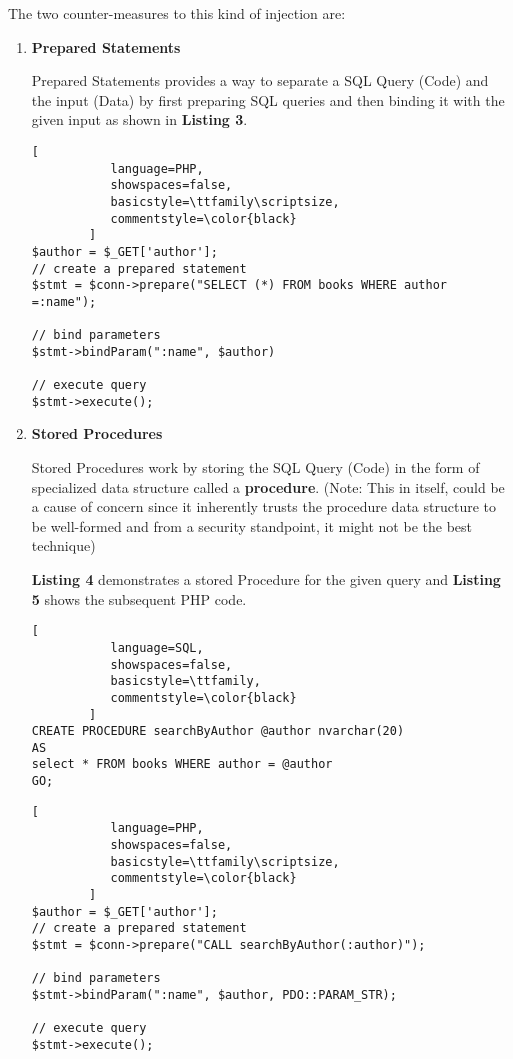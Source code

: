 \documentclass[10pt,a4paper,oneside]{article}
\begin{document}
The two counter-measures to this kind of injection are:
\begin{enumerate}
\item \textbf{Prepared Statements}


Prepared Statements provides a way to separate a SQL Query (Code) and the input (Data) by first preparing SQL queries and then binding it with the given input as shown in \textbf{Listing 3}.
\lstset{keywordstyle=\bfseries}
\begin{lstlisting}[
           language=PHP,
           showspaces=false,
           basicstyle=\ttfamily\scriptsize,
           commentstyle=\color{black}
        ]
$author = $_GET['author'];
// create a prepared statement
$stmt = $conn->prepare("SELECT (*) FROM books WHERE author =:name");

// bind parameters
$stmt->bindParam(":name", $author)

// execute query
$stmt->execute();
\end{lstlisting}

\item \textbf{Stored Procedures}

Stored Procedures work by storing the SQL Query (Code) in the form of specialized data structure called a \textbf{procedure}. (Note: This in itself, could be a cause of concern since it inherently trusts the procedure data structure to be well-formed  and from a security standpoint, it might not be the best technique)

\textbf{Listing 4} demonstrates a stored Procedure for the given query and \textbf{Listing 5} shows the subsequent PHP code.

\begin{lstlisting}[
           language=SQL,
           showspaces=false,
           basicstyle=\ttfamily,
           commentstyle=\color{black}
        ]
CREATE PROCEDURE searchByAuthor @author nvarchar(20)
AS
select * FROM books WHERE author = @author
GO;
\end{lstlisting}

\lstset{keywordstyle=\bfseries}
\begin{lstlisting}[
           language=PHP,
           showspaces=false,
           basicstyle=\ttfamily\scriptsize,
           commentstyle=\color{black}
        ]
$author = $_GET['author'];
// create a prepared statement
$stmt = $conn->prepare("CALL searchByAuthor(:author)");

// bind parameters
$stmt->bindParam(":name", $author, PDO::PARAM_STR);

// execute query
$stmt->execute();
\end{lstlisting}



\end{enumerate}
\end{document}
